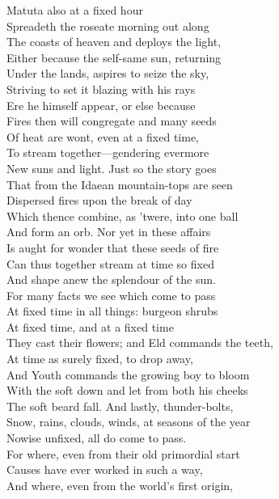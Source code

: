 Matuta also at a fixed hour\\
Spreadeth the roseate morning out along\\
The coasts of heaven and deploys the light,\\
Either because the self-same sun, returning\\
Under the lands, aspires to seize the sky,\\
Striving to set it blazing with his rays\\
Ere he himself appear, or else because\\
Fires then will congregate and many seeds\\
Of heat are wont, even at a fixed time,\\
To stream together—gendering evermore\\
New suns and light. Just so the story goes\\
That from the Idaean mountain-tops are seen\\
Dispersed fires upon the break of day\\
Which thence combine, as 'twere, into one ball\\
And form an orb. Nor yet in these affairs\\
Is aught for wonder that these seeds of fire\\
Can thus together stream at time so fixed\\
And shape anew the splendour of the sun.\\
For many facts we see which come to pass\\
At fixed time in all things: burgeon shrubs\\
At fixed time, and at a fixed time\\
They cast their flowers; and Eld commands the teeth,\\
At time as surely fixed, to drop away,\\
And Youth commands the growing boy to bloom\\
With the soft down and let from both his cheeks\\
The soft beard fall. And lastly, thunder-bolts,\\
Snow, rains, clouds, winds, at seasons of the year\\
Nowise unfixed, all do come to pass.\\
For where, even from their old primordial start\\
Causes have ever worked in such a way,\\
And where, even from the world's first origin,\\
